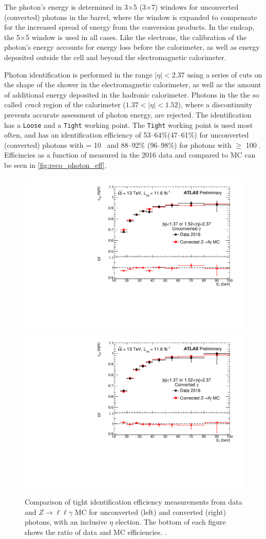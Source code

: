 The photon's energy is determined in 3$\times$5 (3$\times$7) windows for unconverted (converted) photons in the barrel, where the window is expanded to compensate for the increased spread of energy from the conversion products. In the endcap, the 5$\times$5 window is used in all cases. Like the electrons, the calibration of the photon's energy accounts for energy loss before the calorimeter, as well as energy deposited outside the cell and beyond the electromagnetic calorimeter.

Photon identification is performed in the range $|\eta|<2.37$ using a series of cuts on the shape of the shower in the electromagnetic calorimeter, as well as the amount of additional energy deposited in the hadronic calorimeter. Photons in the the so called \textit{crack} region of the calorimeter ($1.37<|\eta|<1.52$), where a discontinuity prevents accurate assessment of photon energy, are rejected. The identification has a \texttt{Loose} and a \texttt{Tight} working point. The \texttt{Tight} working point is used most often, and has an identification efficiency of 53–64\%(47–61\%) for unconverted (converted) photons with \et = 10 \gev~and 88–92\% (96–98\%) for photons with \et $\geq$ 100 \gev \cite{ATL-PHYS-PUB-2016-014}. Efficincies as a function of \pt measured in the 2016 data and compared to \ac{MC} can be seen in \autoref{fig:reco_photon_eff}.

\begin{centering}
\begin{figure}[!hbt]
\myfloatalign
\includegraphics[width=.48\linewidth]{figures/reco/photon_fig_01.pdf}
\includegraphics[width=.48\linewidth]{figures/reco/photon_fig_02.pdf}
\caption{ Comparison of tight identification efficiency measurements from data and $Z\rightarrow \ell\ell\gamma$ \ac{MC} for unconverted (left) and converted (right) photons, with an inclusive $\eta$ election. The bottom of each figure shows the ratio of data and \ac{MC} efficiencies. \cite{EGAM-2016-003}.}
\label{fig:reco_photon_eff}
\end{figure}
\end{centering}

